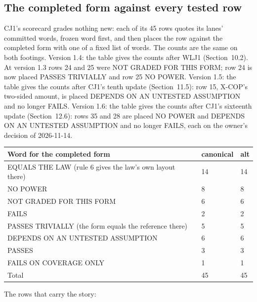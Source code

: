 \documentclass[10pt]{article}
\begin{document}
\subsection{The completed form against every tested row}
CJ1's scorecard grades nothing new: each of its 45 rows quotes its lanes' committed words, frozen word first, and then places the row against the completed form with one of a fixed list of words. The counts are the same on both footings. Version 1.4: the table gives the counts after WLJ1 (Section~10.2). At version 1.3 rows 24 and 25 were NOT GRADED FOR THIS FORM; row 24 is now placed PASSES TRIVIALLY and row 25 NO POWER. Version 1.5: the table gives the counts after CJ1's tenth update (Section~11.5): row 15, X-COP's two-sided amount, is placed DEPENDS ON AN UNTESTED ASSUMPTION and no longer FAILS. Version 1.6: the table gives the counts after CJ1's sixteenth update (Section~12.6): rows 35 and 28 are placed NO POWER and DEPENDS ON AN UNTESTED ASSUMPTION and no longer FAILS, each on the owner's decision of 2026-11-14.
{\small
\begin{longtable}{@{}p{8.5cm}p{2.2cm}p{2.2cm}@{}}\toprule
Word for the completed form & canonical & alt\\\midrule\endhead
EQUALS THE LAW (rule 6 gives the law's own layout there) & 14 & 14\\
NO POWER & 8 & 8\\
NOT GRADED FOR THIS FORM & 6 & 6\\
FAILS & 2 & 2\\
PASSES TRIVIALLY (the form equals the reference there) & 5 & 5\\
DEPENDS ON AN UNTESTED ASSUMPTION & 6 & 6\\
PASSES & 3 & 3\\
FAILS ON COVERAGE ONLY & 1 & 1\\
Total & 45 & 45\\\bottomrule
\end{longtable}}
The rows that carry the story:
\end{document}
